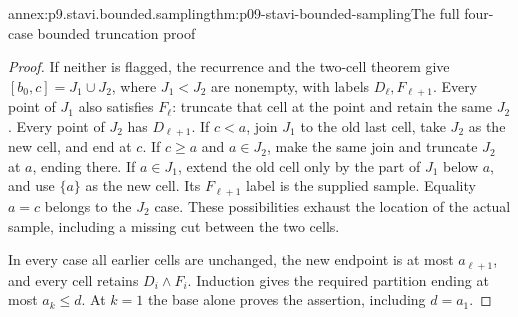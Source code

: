 \begin{annexitem}{annex:p9.stavi.bounded.sampling}{thm:p09-stavi-bounded-sampling}{The full four-case bounded truncation proof}
\begin{proof}
If neither is flagged,
the recurrence and the
two-cell theorem give
\([b_0,c]=J_1\cup J_2\),
where \(J_1<J_2\) are
nonempty, with labels
\(D_\ell,F_{\ell+1}\).
Every point of \(J_1\)
also satisfies \(F_\ell\):
truncate that cell at
the point and retain
the same \(J_2\).
Every point of \(J_2\)
has \(D_{\ell+1}\).
If \(c<a\), join
\(J_1\) to the old
last cell, take
\(J_2\) as the new
cell, and end at \(c\).
If \(c\geq a\) and
\(a\in J_2\), make
the same join and
truncate \(J_2\) at
\(a\), ending there.
If \(a\in J_1\),
extend the old cell
only by the part
of \(J_1\) below
\(a\), and use
\(\{a\}\) as the
new cell. Its
\(F_{\ell+1}\) label
is the supplied
sample. Equality
\(a=c\) belongs
to the \(J_2\)
case. These
possibilities exhaust
the location of
the actual sample,
including a missing
cut between the
two cells.

In every case all
earlier cells are
unchanged, the new
endpoint is at most
\(a_{\ell+1}\), and
every cell retains
\(D_i\land F_i\).
Induction gives
the required
partition ending
at most \(a_k\leq d\).
At \(k=1\) the
base alone proves
the assertion,
including \(d=a_1\).
\end{proof}
\end{annexitem}

